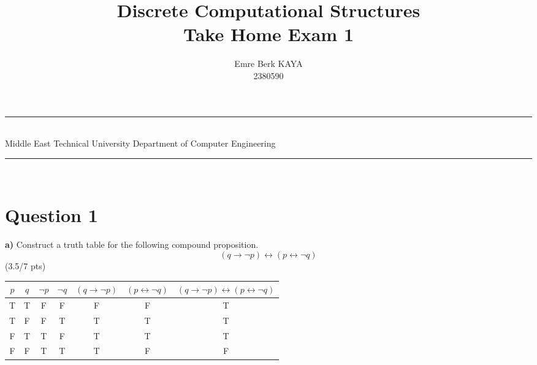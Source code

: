 \documentclass[a4paper,12pt]{article}
\title{Discrete Computational Structures \\ Take Home Exam 1}
\author{Emre Berk KAYA \\ 2380590} %
\date{} %
\newcommand{\HRule}{\rule{\linewidth}{1mm}}
\newcommand\tab[1][1cm]{\hspace*{#1}}
\begin{document}
\HRule\\
Middle East Technical University \hfill Department of Computer Engineering
{\let\newpage\relax\maketitle}
\HRule\\
\vspace{0.1cm}


\section*{Question 1 \hfill {}}

\tab \textbf{a)} Construct a truth table for the following compound proposition.
\begin{equation*}
    (q \rightarrow \neg p)\leftrightarrow (p \leftrightarrow \neg q)
\end{equation*} 
\hfill \small{(3.5/7 pts)} \\
\begin{tcolorbox}
\begin{center}
    \begin{tabular}{||c|c|c|c|c|c|c||} 
    
    \hline
    $p$ & $q$ & $\neg p$ & $\neg q$ & $(q \rightarrow \neg p)$ & $(p \leftrightarrow \neg q)$
    & $(q \rightarrow \neg p)\leftrightarrow (p \leftrightarrow \neg q)$ \\ [2.0ex]
    \hline
    T & T & F & F & F & F & T \\ [0.2ex]
    \hline
    T & F & F & T & T & T & T \\ [0.2ex]
    \hline 
    F & T & T & F & T & T & T \\ [0.2ex]
    \hline
    F & F & T & T & T & F & F \\ [0.2ex]
    \hline
    
    \end{tabular}
    
\end{center}
\end{tcolorbox}
\end{document}
